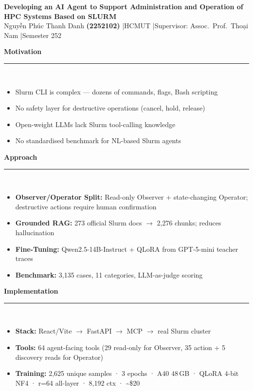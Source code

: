 \documentclass[12pt]{extarticle}
\newcommand{\sectionhead}[1]{%
  {\bfseries\color{seccolor}\large #1}\\[-3pt]
  {\color{secline}\rule{\linewidth}{1pt}}\\[1pt]
}
\begin{document}
\colorbox{titlebg}{\parbox{\linewidth}{%
  \centering\color{white}\vspace{1pt}
  {\Large\bfseries Developing an AI Agent to Support Administration and Operation of HPC Systems Based on SLURM}\\[1pt]
  {\small Nguyễn Phúc Thanh Danh \textbf{(2252102)} \quad|\quad HCMUT \quad|\quad Supervisor: Assoc.\ Prof.\ Thoại Nam \quad|\quad Semester 252}
  \vspace{1pt}
}}

\vspace{4pt}

\noindent
\begin{minipage}[t]{0.30\linewidth}

\sectionhead{Motivation}
\begin{itemize}
  \item Slurm CLI is complex --- dozens of commands, flags, Bash scripting
  \item No safety layer for destructive operations (cancel, hold, release)
  \item Open-weight LLMs lack Slurm tool-calling knowledge
  \item No standardised benchmark for NL-based Slurm agents
\end{itemize}

\vspace{0.5em}
\sectionhead{Approach}
\begin{itemize}
  \item \textbf{Observer/Operator Split:} Read-only Observer + state-changing Operator; destructive actions require human confirmation
  \item \textbf{Grounded RAG:} 273 official Slurm docs $\to$ 2,276 chunks; reduces hallucination
  \item \textbf{Fine-Tuning:} Qwen2.5-14B-Instruct + QLoRA from GPT-5-mini teacher traces
  \item \textbf{Benchmark:} 3,135 cases, 11 categories, LLM-as-judge scoring
\end{itemize}

\vspace{0.5em}
\sectionhead{Implementation}
\begin{itemize}
  \item \textbf{Stack:} React/Vite $\to$ FastAPI $\to$ MCP $\to$ real Slurm cluster
  \item \textbf{Tools:} 64 agent-facing tools (29 read-only for Observer, 35 action + 5 discovery reads for Operator)
  \item \textbf{Training:} 2,625 unique samples · 3 epochs · A40 48\,GB · QLoRA 4-bit NF4 · r=64 all-layer · 8,192 ctx · \textasciitilde\$20
\end{itemize}

\end{minipage}%
\end{document}
